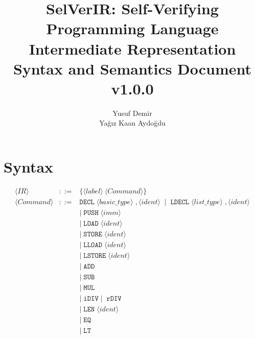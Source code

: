 \documentclass{article}
\title{SelVerIR: Self-Verifying Programming Language \\ Intermediate Representation Syntax and Semantics Document \\ v1.0.0}
\author{Yusuf Demir \\ Yağız Kaan Aydoğdu}
\begin{document}
\maketitle


\newpage
\section{Syntax}

\[
\begin{array}{rcl}

\langle \mathit{IR} \rangle &::=& \{\langle \mathit{label} \rangle\ \langle \mathit{Command} \rangle\} \\[6pt]

\langle \mathit{Command} \rangle
&::=& \texttt{DECL} \; \langle basic\_type \rangle \; , \langle ident \rangle \;\mid\; \texttt{LDECL} \; \langle list\_type \rangle \; , \langle ident \rangle
\\[2pt]

&& \mid\; \texttt{PUSH} \; \langle imm \rangle
\\[2pt]

&& \mid\; \texttt{LOAD} \; \langle ident \rangle
\\[2pt]

&& \mid\; \texttt{STORE} \; \langle ident \rangle
\\[2pt]

&& \mid\; \texttt{LLOAD} \; \langle ident \rangle
\\[2pt]

&& \mid\; \texttt{LSTORE} \; \langle ident \rangle
\\[2pt]

&& \mid\; \texttt{ADD}
\\[2pt]

&& \mid\; \texttt{SUB}
\\[2pt]

&& \mid\; \texttt{MUL}
\\[2pt]

&& \mid\; \texttt{iDIV} \mid\; \texttt{rDIV}
\\[2pt]

&& \mid\; \texttt{LEN} \; \langle ident \rangle
\\[2pt]

&& \mid\; \texttt{EQ}
\\[2pt]

&& \mid\; \texttt{LT}
\\[2pt]


\end{array}\]
\end{document}
